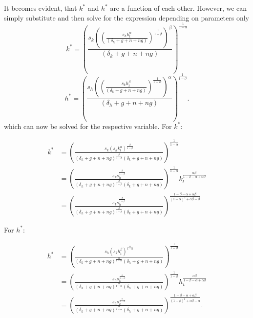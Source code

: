 \documentclass{article}
\begin{document}
It becomes evident, that $k^*$ and $h^*$ are a function of each other. However, we can simply substitute and then solve for the expression depending on parameters only
\begin{equation}
 k^*= \left(\frac{s_k \left(\left(\frac{s_h k_t^\alpha}{\left(\delta_h +g+n+ng\right)}\right)^{\frac{1}{1-\beta}}\right)^\beta}{\left(\delta_k +g+n+ng\right)}\right)^{\frac{1}{1-\alpha}} 
\end{equation}
\begin{equation}
 h^*= \left(\frac{s_h \left(\left(\frac{s_k h_t^\beta}{\left(\delta_k +g+n+ng\right)}\right)^{\frac{1}{1-\alpha}}\right)^\alpha}{\left(\delta_h +g+n+ng\right)}\right)^{\frac{1}{1-\beta}}.
\end{equation}
which can now be solved for the respective variable. For $k^*$:
\begin{center}
\begin{align*}
 k^*&= \left(\frac{s_k \left(s_h k_t^\alpha \right)^{\frac{ \beta}{1-\beta}}}{\left(\delta_h +g+n+ng\right)^{\frac{\beta}{1-\beta}}\left(\delta_k +g+n+ng\right)}\right)^{\frac{1}{1-\alpha}} \\
 &= \left(\frac{s_k s_h^{\frac{ \beta}{1-\beta}}}{\left(\delta_h +g+n+ng\right)^{\frac{\beta}{1-\beta}}\left(\delta_k +g+n+ng\right)}\right)^{\frac{1}{1-\alpha}} k_t^{\frac{\alpha \beta}{1-\beta - \alpha + \alpha \beta}} \\
  &= \left(\frac{s_k s_h^{\frac{ \beta}{1-\beta}}}{\left(\delta_h +g+n+ng\right)^{\frac{\beta}{1-\beta}}\left(\delta_k +g+n+ng\right)}\right)^{\frac{1-\beta- \alpha + \alpha \beta}{\left(1-\alpha\right)^2 +\alpha \beta -\beta}} 
  \end{align*}
\end{center}
For $h^*$:
\begin{center}
\begin{align*}
 h^*&= \left(\frac{s_h \left(s_k h_t^\beta\right)^{\frac{\alpha}{1-\alpha}}}{\left(\delta_k +g+n+ng\right)^{\frac{\alpha}{1-\alpha}}\left(\delta_h +g+n+ng\right)}\right)^{\frac{1}{1-\beta}} \\
 &= \left(\frac{s_h s_k^{\frac{\alpha}{1-\alpha}}}{\left(\delta_k +g+n+ng\right)^{\frac{\alpha}{1-\alpha}}\left(\delta_h +g+n+ng\right)}\right)^{\frac{1}{1-\beta}} h_t^{\frac{ \alpha \beta}{1-\beta-\alpha +\alpha \beta}}\\
 &= \left(\frac{s_h s_k^{\frac{\alpha}{1-\alpha}}}{\left(\delta_k +g+n+ng\right)^{\frac{\alpha}{1-\alpha}}\left(\delta_h +g+n+ng\right)}\right)^{\frac{1-\beta- \alpha + \alpha \beta}{\left(1-\beta \right)^2 +\alpha \beta -\alpha}}.
\end{align*}
\end{center}
\end{document}
